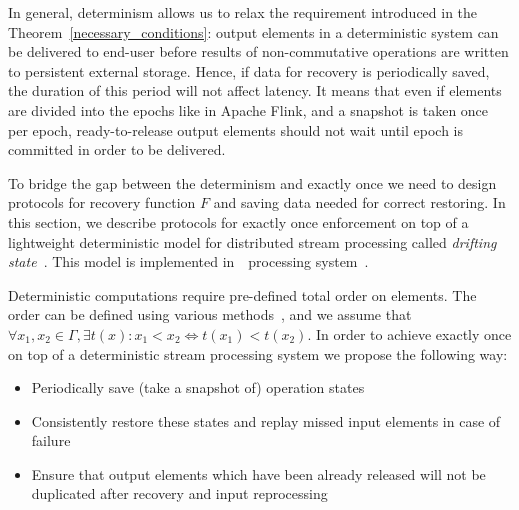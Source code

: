 
\label {fs-consistency-section}

In general, determinism allows us to relax the requirement introduced in the Theorem~\ref{necessary_conditions}: output elements in a deterministic system can be delivered to end-user before results of non-commutative operations are written to persistent external storage. Hence, if data for recovery is periodically saved, the duration of this period will not affect latency. It means that even if elements are divided into the epochs like in Apache Flink, and a snapshot is taken once per epoch, ready-to-release output elements should not wait until epoch is committed in order to be delivered. 

To bridge the gap between the determinism and exactly once we need to design protocols for recovery function $F$ and saving data needed for correct restoring. In this section, we describe protocols for exactly once enforcement on top of a lightweight deterministic model for distributed stream processing called {\em drifting state}~\cite{we2018adbis}. This model is implemented in~\FlameStream\ processing system~\cite{we2018beyondmr}.

Deterministic computations require pre-defined total order on elements. The order can be defined using various methods~\cite{we2018seim}, and we assume that $\forall x_1,x_2\in \Gamma, \exists t(x): x_1 < x_2 \Longleftrightarrow t(x_1) < t(x_2)$. In order to achieve exactly once on top of a deterministic stream processing system we propose the following way:
\begin{itemize}
    \item Periodically save (take a snapshot of) operation states
    \item Consistently restore these states and replay missed input elements in case of failure
    \item Ensure that output elements which have been already released will not be duplicated after recovery and input reprocessing
\end{itemize}

